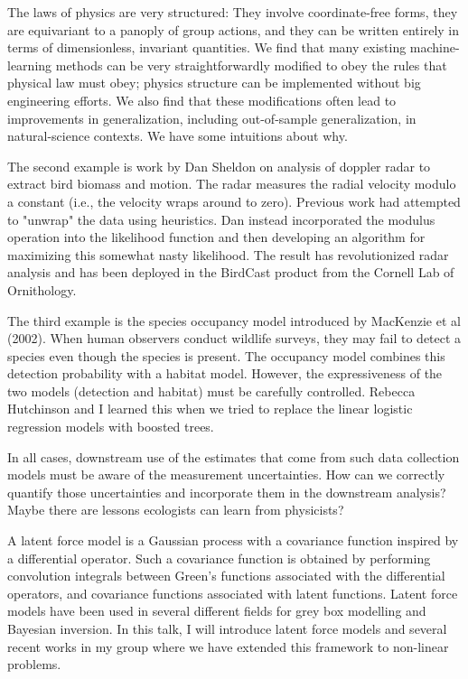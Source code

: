 The laws of physics are very structured: They involve coordinate-free forms, they are equivariant to a panoply of group actions, and they can be written entirely in terms of dimensionless, invariant quantities. We find that many existing machine-learning methods can be very straightforwardly modified to obey the rules that physical law must obey; physics structure can be implemented without big engineering efforts. We also find that these modifications often lead to improvements in generalization, including out-of-sample generalization, in natural-science contexts. We have some intuitions about why.

The second example is work by Dan Sheldon on analysis of doppler radar
to extract bird biomass and motion. The radar measures the radial
velocity modulo a constant (i.e., the velocity wraps around to zero).
Previous work had attempted to "unwrap" the data using heuristics. Dan
instead incorporated the modulus operation into the likelihood function
and then developing an algorithm for maximizing this somewhat nasty
likelihood. The result has revolutionized radar analysis and has been
deployed in the BirdCast product from the Cornell Lab of Ornithology.

The third example is the species occupancy model introduced by MacKenzie
et al (2002). When human observers conduct wildlife surveys, they may
fail to detect a species even though the species is present. The
occupancy model combines this detection probability with a habitat
model. However, the expressiveness of the two models (detection and
habitat) must be carefully controlled. Rebecca Hutchinson and I learned
this when we tried to replace the linear logistic regression models with
boosted trees.

In all cases, downstream use of the estimates that come from such data
collection models must be aware of the measurement uncertainties. How
can we correctly quantify those uncertainties and incorporate them in
the downstream analysis? Maybe there are lessons ecologists can learn
from physicists?

\license

A latent force model is a Gaussian process with a covariance function inspired by a differential operator. Such a covariance function is obtained by performing convolution integrals between Green's functions associated with the differential operators, and covariance functions associated with latent functions. Latent force models have been used in several different fields for grey box modelling and Bayesian inversion. In this talk, I will introduce latent force models and several recent works in my group where we have extended this framework to non-linear problems.

